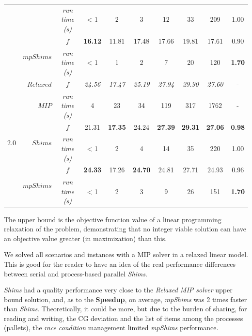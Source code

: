 \documentclass[preprint,authoryear]{elsarticle}
\begin{document}
\begin{table}[H]
\begin{tabular}{crcccccccc}
        &                                 & {\it run time (s)} &     < 1   &     2     &     3     &     12    &     33    &   209     &  1.00 \\%
        \cmidrule{2-10}		                      
        &\multirow{2}{*}{ $mpShims$}      & $f$                &{\bf 16.12}&     11.81 &     17.48 &  17.66    &   19.81   &  17.61    &  0.90 \\%
        &                                 & {\it run time (s)} &     < 1   &     1     &     2     &     7     &   20      &  120      &  {\bf 1.70}\\%
		\toprule
		\multirow{7}{*}{$2.0$}&$Relaxed$  & $f$                &{\it 24.56}&{\it 17.47}&{\it 25.19}&{\it 27.94}&{\it 29.90}&{\it 27.60}& -\\%
		&                       $MIP$     & {\it run time (s)} &     4     &     23    &    34     &   119     &     317      &   1762        & -\\%
		\cmidrule{2-10}		                       
		&\multirow{2}{*}{ $Shims$}        & $f$                &    21.31  &{\bf 17.35}&   24.24   &{\bf 27.39}&{\bf 29.31}&{\bf 27.06}&{\bf 0.98}  \\%
		&                                 & {\it run time (s)} &     < 1   &     2     &     4     &     14    &     35    &   220     &  1.00 \\%
		\cmidrule{2-10}		                       
		&\multirow{2}{*}{ $mpShims$}      & $f$                &{\bf 24.33}&   17.26   &{\bf 24.70}&   24.81   &   27.71   &  24.93    &  0.96  \\%
		&                                 & {\it run time (s)} &     < 1   &     2     &     3     &     9     &   26      &  151      &  {\bf 1.70}\\%
		\bottomrule	
	\end{tabular}
	\normalsize
\end{table}



The upper bound is the objective function value of a linear programming relaxation of the problem, demonstrating that no integer viable solution can have an objective value greater (in maximization) than this.

We solved all scenarios and instances with a MIP solver in a relaxed linear model. This is good for the reader to have an idea of the real performance differences between serial and process-based parallel {\it Shims}.

{\it Shims} had a quality performance very close to the {\it Relaxed MIP solver} upper bound solution, and, as to the {\bf Speedup}, on average, {\it mpShims} was 2 times faster than {\it Shims}. Theoretically, it could be more, but due to the burden of sharing, for reading and writing, the CG deviation and the list of items among the processes (pallets), the {\it race condition} management limited {\it mpShims} performance.
\end{document}
